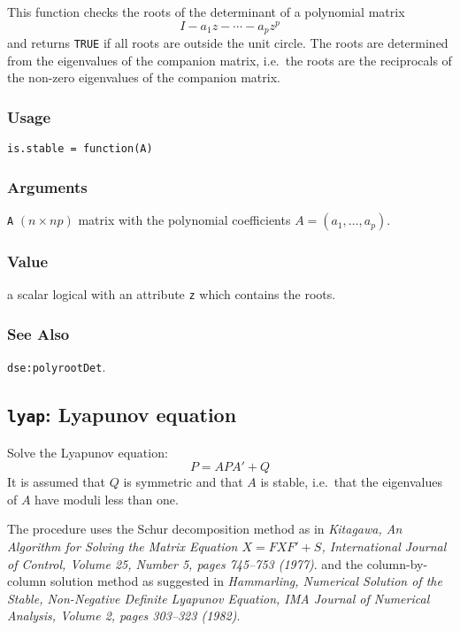 \documentclass[]{article}
\begin{document}
This function checks the roots of the determinant of a polynomial matrix
\[
I - a_1 z - \cdots - a_p z^p
\] and returns \texttt{TRUE} if all roots are outside the unit circle.
The roots are determined from the eigenvalues of the companion matrix,
i.e.~the roots are the reciprocals of the non-zero eigenvalues of the
companion matrix.

\subsubsection*{Usage}\begin{verbatim}
is.stable = function(A) 
\end{verbatim}\subsubsection*{Arguments}\begin{description}
\item \texttt{A} $(n \times np)$ matrix with the polynomial coefficients 
       $A = (a_1,\ldots,a_p)$.
\end{description}\subsubsection*{Value}

a scalar logical with an attribute \texttt{z} which contains the roots.
\subsubsection*{See Also} \texttt{dse:polyrootDet}.

\subsection{\texorpdfstring{\texttt{lyap}: Lyapunov
equation}{lyap: Lyapunov equation}}\label{lyap-lyapunov-equation}

Solve the Lyapunov equation: \[ 
P = A P A' + Q
\] It is assumed that \(Q\) is symmetric and that \(A\) is stable,
i.e.~that the eigenvalues of \(A\) have moduli less than one.

The procedure uses the Schur decomposition method as in \emph{Kitagawa,
An Algorithm for Solving the Matrix Equation \(X = F X F' + S\),
International Journal of Control, Volume 25, Number 5, pages 745--753
(1977)}. and the column-by-column solution method as suggested in
\emph{Hammarling, Numerical Solution of the Stable, Non-Negative
Definite Lyapunov Equation, IMA Journal of Numerical Analysis, Volume 2,
pages 303--323 (1982)}.
\end{document}

